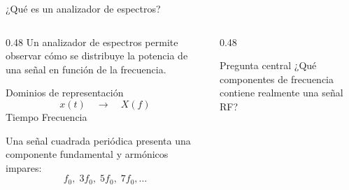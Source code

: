 \documentclass[aspectratio=169]{beamer}
\begin{document}
\begin{frame}{¿Qué es un analizador de espectros?}
\begin{columns}[T,onlytextwidth]
\begin{column}{0.48\textwidth}
Un analizador de espectros permite observar cómo se distribuye la potencia de una señal en función de la frecuencia.
\medskip
\begin{block}{Dominios de representación}
\[
x(t)\quad\longrightarrow\quad X(f)
\]
\centering
Tiempo \hspace{1.4cm} Frecuencia
\end{block}
\medskip
Una señal cuadrada periódica presenta una componente fundamental y armónicos impares:
\[
f_0,\;3f_0,\;5f_0,\;7f_0,\ldots
\]
\end{column}
\begin{column}{0.48\textwidth}
\centering
{}
\medskip
\begin{alertblock}{Pregunta central}
¿Qué componentes de frecuencia contiene realmente una señal RF?
\end{alertblock}
\end{column}
\end{columns}
\end{frame}
\end{document}
